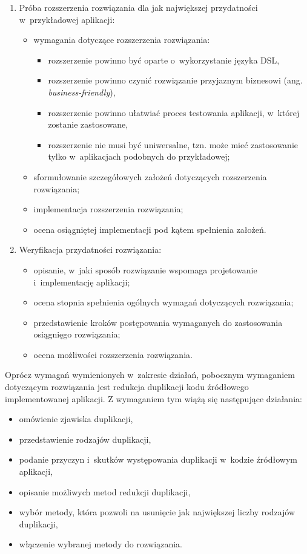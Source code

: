 \begin{enumerate}
 \item Próba rozszerzenia rozwiązania dla jak największej przydatności w~przykładowej aplikacji:
  \begin{itemize}
   \item wymagania dotyczące rozszerzenia rozwiązania:
    \begin{itemize}
     \item rozszerzenie powinno być oparte o~wykorzystanie języka DSL,
     \item rozszerzenie powinno czynić rozwiązanie przyjaznym biznesowi (ang. \emph{business-friendly}),
     \item rozszerzenie powinno ułatwiać proces testowania aplikacji, w~której zostanie zastosowane,
     \item rozszerzenie nie musi być uniwersalne, tzn. może mieć zastosowanie tylko w~aplikacjach podobnych do przykładowej;
    \end{itemize}
   \item sformułowanie szczegółowych założeń dotyczących rozszerzenia rozwiązania;
   \item implementacja rozszerzenia rozwiązania;
   \item ocena osiągniętej implementacji pod kątem spełnienia założeń.
  \end{itemize}
 
 \item Weryfikacja przydatności rozwiązania:
  \begin{itemize}
   \item opisanie, w~jaki sposób rozwiązanie wspomaga projetowanie i~implementację aplikacji;
   \item ocena stopnia spełnienia ogólnych wymagań dotyczących rozwiązania;
   \item przedstawienie kroków postępowania wymaganych do zastosowania osiągnięgo rozwiązania;
   \item ocena możliwości rozszerzenia rozwiązania.
  \end{itemize}

\end{enumerate}

Oprócz wymagań wymienionych w~zakresie działań, pobocznym wymaganiem dotyczącym rozwiązania jest redukcja duplikacji kodu źródłowego implementowanej aplikacji.
Z wymaganiem tym wiążą się następujące działania:

\begin{itemize}
 \item omówienie zjawiska duplikacji,
 \item przedstawienie rodzajów duplikacji,
 \item podanie przyczyn i~skutków występowania duplikacji w~kodzie źródłowym aplikacji,
 \item opisanie możliwych metod redukcji duplikacji,
 \item wybór metody, która pozwoli na usunięcie jak największej liczby rodzajów duplikacji,
 \item włączenie wybranej metody do rozwiązania.
\end{itemize}



